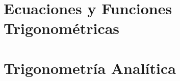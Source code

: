 \documentclass[12pt, a4paper, twoside]{book}
\begin{document}
% 
% 
% 

% 
% 
% 

% 
% 
% 

% 
% 
% 

\chapter{Ecuaciones y Funciones Trigonométricas}

% 
% 
% 

% 
% 
% 

% 
% 
% 

% 
% 
% 

\chapter{Trigonometría Analítica}

% 
% 
% 
\end{document}
